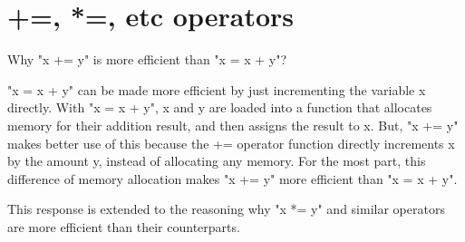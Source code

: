 \documentclass{article}
\begin{document}
\section{+=, *=, etc operators}
Why "x += y" is more efficient than "x = x + y"?

"x = x + y" can be made more efficient by just incrementing the variable x directly. With "x = x + y", x and y are loaded into a function that allocates memory for their addition result, and then assigns the result to x. But, "x += y" makes better use of this because the += operator function directly increments x by the amount y, instead of allocating any memory. For the most part, this difference of memory allocation makes "x += y" more efficient than "x = x + y".

This response is extended to the reasoning why "x *= y" and similar operators are more efficient than their counterparts.
\end{document}
